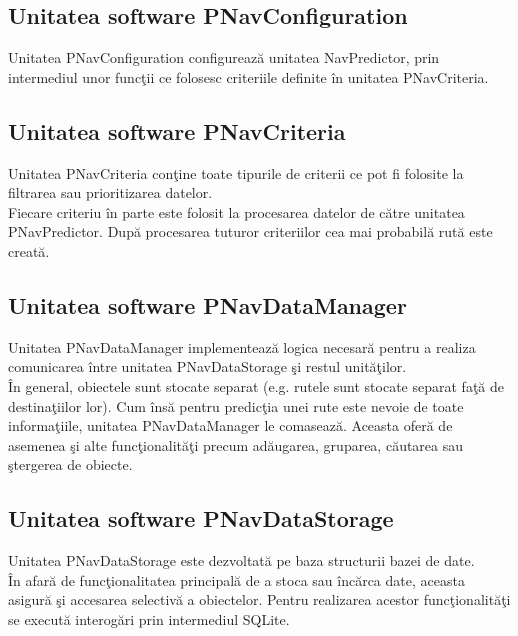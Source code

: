 \subsection{Unitatea software PNavConfiguration} 
Unitatea PNavConfiguration configurează unitatea NavPredictor, prin intermediul unor funcţii ce folosesc criteriile definite în unitatea PNavCriteria.


\subsection{Unitatea software PNavCriteria} 
Unitatea PNavCriteria conţine toate tipurile de criterii ce pot fi folosite la filtrarea sau prioritizarea datelor.
\vspace{6pt}
\\Fiecare criteriu în parte este folosit la procesarea datelor de către unitatea PNavPredictor.
După procesarea tuturor criteriilor cea mai probabilă rută este creată.


\subsection{Unitatea software PNavDataManager} 
Unitatea PNavDataManager implementează logica necesară pentru a realiza comunicarea între unitatea PNavDataStorage şi restul unităţilor.
\vspace{6pt}
\\În general, obiectele sunt stocate separat (e.g. rutele sunt stocate separat faţă de destinaţiilor lor). Cum însă pentru predicţia unei rute este nevoie de toate informaţiile, unitatea PNavDataManager le comasează. Aceasta oferă de asemenea şi alte funcţionalităţi precum adăugarea, gruparea, căutarea sau ştergerea de obiecte.


\subsection{Unitatea software PNavDataStorage} 
Unitatea PNavDataStorage este dezvoltată pe baza structurii bazei de date.
\vspace{6pt}
\\În afară de funcţionalitatea principală de a stoca sau încărca date, aceasta asigură şi accesarea selectivă a obiectelor. Pentru realizarea acestor funcţionalităţi se execută interogări prin intermediul SQLite.
